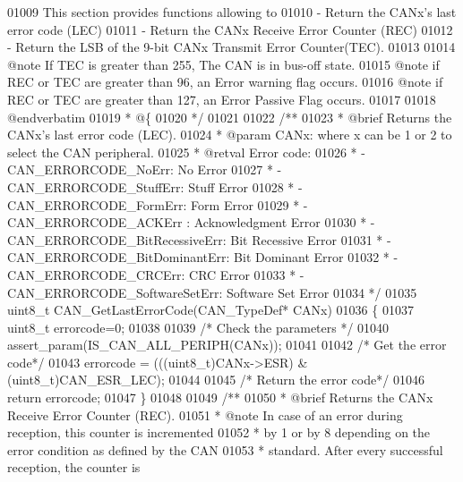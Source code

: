 \begin{DoxyCode}
01009 \textcolor{comment}{  This section provides functions allowing to }
01010 \textcolor{comment}{   -  Return the CANx's last error code (LEC)}
01011 \textcolor{comment}{   -  Return the CANx Receive Error Counter (REC)}
01012 \textcolor{comment}{   -  Return the LSB of the 9-bit CANx Transmit Error Counter(TEC).}
01013 \textcolor{comment}{   }
01014 \textcolor{comment}{   @note If TEC is greater than 255, The CAN is in bus-off state.}
01015 \textcolor{comment}{   @note if REC or TEC are greater than 96, an Error warning flag occurs.}
01016 \textcolor{comment}{   @note if REC or TEC are greater than 127, an Error Passive Flag occurs.}
01017 \textcolor{comment}{                        }
01018 \textcolor{comment}{@endverbatim}
01019 \textcolor{comment}{  * @\{}
01020 \textcolor{comment}{  */}
01021 
01022 \textcolor{comment}{/**}
01023 \textcolor{comment}{  * @brief  Returns the CANx's last error code (LEC).}
01024 \textcolor{comment}{  * @param  CANx: where x can be 1 or 2 to select the CAN peripheral.}
01025 \textcolor{comment}{  * @retval Error code: }
01026 \textcolor{comment}{  *          - CAN\_ERRORCODE\_NoErr: No Error  }
01027 \textcolor{comment}{  *          - CAN\_ERRORCODE\_StuffErr: Stuff Error}
01028 \textcolor{comment}{  *          - CAN\_ERRORCODE\_FormErr: Form Error}
01029 \textcolor{comment}{  *          - CAN\_ERRORCODE\_ACKErr : Acknowledgment Error}
01030 \textcolor{comment}{  *          - CAN\_ERRORCODE\_BitRecessiveErr: Bit Recessive Error}
01031 \textcolor{comment}{  *          - CAN\_ERRORCODE\_BitDominantErr: Bit Dominant Error}
01032 \textcolor{comment}{  *          - CAN\_ERRORCODE\_CRCErr: CRC Error}
01033 \textcolor{comment}{  *          - CAN\_ERRORCODE\_SoftwareSetErr: Software Set Error  }
01034 \textcolor{comment}{  */}
01035 uint8\_t CAN_GetLastErrorCode(CAN\_TypeDef* CANx)
01036 \{
01037   uint8\_t errorcode=0;
01038 
01039   \textcolor{comment}{/* Check the parameters */}
01040   assert_param(IS\_CAN\_ALL\_PERIPH(CANx));
01041 
01042   \textcolor{comment}{/* Get the error code*/}
01043   errorcode = (((uint8\_t)CANx->ESR) & (uint8\_t)CAN_ESR_LEC);
01044 
01045   \textcolor{comment}{/* Return the error code*/}
01046   \textcolor{keywordflow}{return} errorcode;
01047 \}
01048 
01049 \textcolor{comment}{/**}
01050 \textcolor{comment}{  * @brief  Returns the CANx Receive Error Counter (REC).}
01051 \textcolor{comment}{  * @note   In case of an error during reception, this counter is incremented }
01052 \textcolor{comment}{  *         by 1 or by 8 depending on the error condition as defined by the CAN }
01053 \textcolor{comment}{  *         standard. After every successful reception, the counter is }

\end{DoxyCode}
